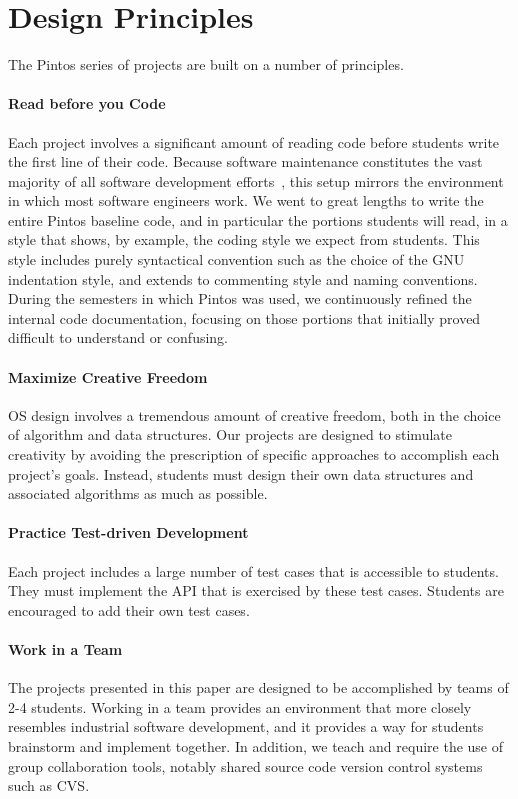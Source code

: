 \section{Design Principles}
\label{sec:designprinciples}

The Pintos series of projects are built on a number of principles.

\paragraph{Read before you Code}
Each project involves a significant amount of reading code before
students write the first line of their code.  
Because software maintenance constitutes the vast majority of all
software development efforts~\cite{Boehm1981Software}, this setup mirrors the 
environment in which most software engineers work.
We went to great lengths to write the entire Pintos baseline code,
and in particular the portions students will read, in a style that shows,
by example, the coding style we expect from students.  This style
includes purely syntactical convention such as the choice of the
GNU indentation style, and extends to commenting style and naming 
conventions.  During the semesters in which Pintos was used, we
continuously refined the internal code documentation, focusing on those 
portions that initially proved difficult to understand or confusing.

\paragraph{Maximize Creative Freedom}
OS design involves a tremendous amount of creative freedom, both in the
choice of algorithm and data structures.  Our projects are designed to
stimulate creativity by avoiding the prescription of specific approaches
to accomplish each project's goals.  Instead, students must design their
own data structures and associated algorithms as much as possible.

\paragraph{Practice Test-driven Development}
Each project includes a large number of test cases that is accessible
to students.  
They must implement the API that is exercised by these test cases.
Students are encouraged to add their own test cases.

\paragraph{Work in a Team}
The projects presented in this paper are designed to be accomplished by teams of 
2-4 students.  Working in a team provides an environment that more closely resembles
industrial software development, and it provides a way for students brainstorm and
implement together.  In addition, we teach and require the use of group collaboration tools,
notably shared source code version control systems such as CVS.

